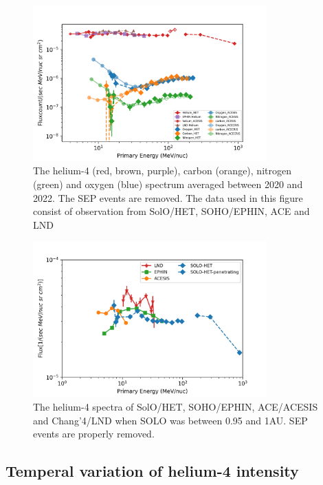 \begin{figure}[!htb]
    \centering
    \includegraphics[width = 0.8\textwidth]{images/ACR/ACE_SIS_CRIS_SOLO_all_3.png}
    \caption[The quite time spactra of helium, carbon, nitrogen and oxygen between 2020 and 2022]{The helium-4 (red, brown, purple), carbon (orange), nitrogen (green) and oxygen (blue) spectrum averaged between 2020 and 2022. The \ac{SEP} events are removed. The data used in this figure consist of observation from \ac{SolO}/\ac{HET}, \ac{SOHO}/\ac{EPHIN}, \ac{ACE} and \ac{LND}}
    \label{fig:overview}
\end{figure}
\begin{figure}[!htb]
    \centering
    \includegraphics[width = 0.8\textwidth]{images/ACR/1AU_comparison_ACE_EPHIN_SOLO_SEP_version2.png}
    \caption[The helium spectra when \ac{SolO} was between 0.95 and 1 au]{The helium-4 spectra of \ac{SolO}/\ac{HET}, \ac{SOHO}/\ac{EPHIN}, \ac{ACE}/\ac{ACESIS} and Chang'4/\ac{LND} when SOLO was between 0.95 and 1AU. \ac{SEP} events are properly removed.}
    \label{fig:helium_spec_1au}
\end{figure}

\subsection*{Temperal variation of helium-4 intensity}


